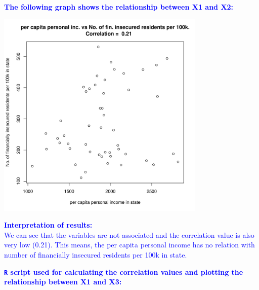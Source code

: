\documentclass[12pt,letterpaper]{article}
\begin{document}
\begin{itemize}
  

\vspace{.25cm}

\textcolor{blue}{
	\noindent \textbf{The following graph shows the relationship between X1 and X2:}
}
\begin{center}
	\includegraphics[width=10cm]{plot_X1_X2.pdf}  
\end{center}

\textcolor{blue}{
	\textbf{Interpretation of results:}\\
	We can see that the variables are not associated and the correlation value is also very low (0.21). This means, the per capita personal income has no relation with number of financially insecured residents per 100k in state.
}

\pagebreak

\textcolor{blue}{
	\noindent \textbf{\texttt{R} script used for calculating the correlation values and plotting the relationship between X1 and X3:}
}

  

\vspace{.25cm}


\end{itemize}
\end{document}
